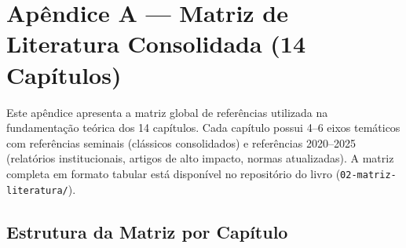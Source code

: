 \chapter*{Apêndice A — Matriz de Literatura Consolidada (14 Capítulos)}

Este apêndice apresenta a matriz global de referências utilizada na fundamentação teórica dos 14 capítulos. Cada capítulo possui 4–6 eixos temáticos com referências seminais (clássicos consolidados) e referências 2020–2025 (relatórios institucionais, artigos de alto impacto, normas atualizadas). A matriz completa em formato tabular está disponível no repositório do livro (\texttt{02-matriz-literatura/}).

\section*{Estrutura da Matriz por Capítulo}

